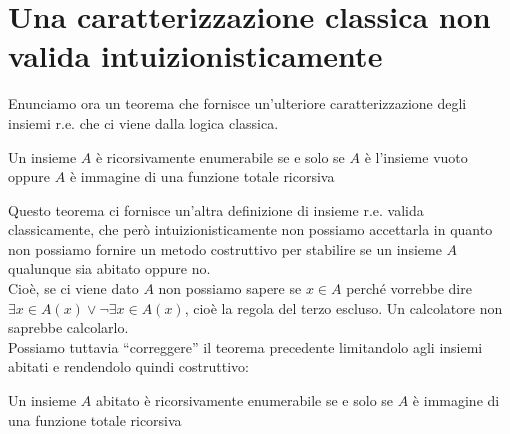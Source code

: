 \section{Una caratterizzazione classica non valida intuizionisticamente}

Enunciamo ora un teorema che fornisce un'ulteriore caratterizzazione degli insiemi r.e. che ci viene dalla logica classica.

\begin{thm}
  Un insieme $A$ \`e ricorsivamente enumerabile se e solo se $A$ è l'insieme vuoto oppure $A$ è immagine di una funzione totale ricorsiva
\end{thm}

Questo teorema ci fornisce un'altra definizione di insieme r.e. valida classicamente, che per\`o intuizionisticamente
non possiamo accettarla in quanto non possiamo fornire un metodo costruttivo per stabilire se un insieme $A$ qualunque sia abitato oppure no.\\
Cioè, se ci viene dato $A$ non possiamo sapere se $x \in A$ perch\'e vorrebbe dire
$\exists x \in A\left(x \right) \vee \neg\exists x \in A \left(x \right)$, cio\`e la regola del terzo escluso.
Un calcolatore non saprebbe calcolarlo.\\

Possiamo tuttavia "`correggere"' il teorema precedente limitandolo agli insiemi abitati e rendendolo quindi costruttivo:
\begin{thm}
  Un insieme $A$ abitato è ricorsivamente enumerabile se e solo se $A$ è immagine di una funzione totale ricorsiva
\end{thm}


